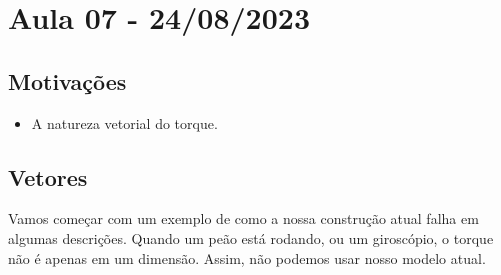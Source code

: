 \documentclass[PhysicsII/physicsII_notes.tex]{subfiles}
\begin{document}
\section{Aula 07 - 24/08/2023}
\subsection{Motivações}
\begin{itemize}
	\item A natureza vetorial do torque.
\end{itemize}
\subsection{Vetores}
Vamos começar com um exemplo de como a nossa construção atual falha em algumas descrições.
Quando um peão está rodando, ou um giroscópio, o torque não é apenas em um dimensão. Assim, não podemos usar nosso modelo atual.
\end{document}
